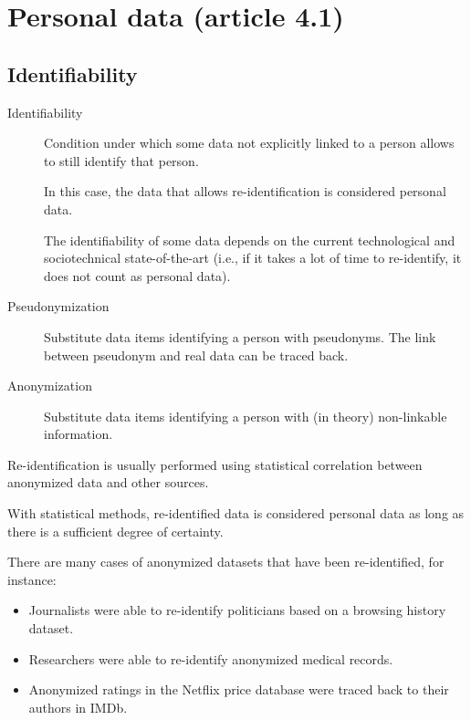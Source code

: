 \section{Personal data (article 4.1)}


\subsection{Identifiability}

\begin{description}
    \item[Identifiability] 
        Condition under which some data not explicitly linked to a person allows to still identify that person.

        In this case, the data that allows re-identification is considered personal data.

        \begin{remark}
            The identifiability of some data depends on the current technological and sociotechnical state-of-the-art (i.e., if it takes a lot of time to re-identify, it does not count as personal data).
        \end{remark}

    \item[Pseudonymization] 
        Substitute data items identifying a person with pseudonyms. The link between pseudonym and real data can be traced back.

    \item[Anonymization] 
        Substitute data items identifying a person with (in theory) non-linkable information.
\end{description}

\begin{remark}
    Re-identification is usually performed using statistical correlation between anonymized data and other sources.
    
    With statistical methods, re-identified data is considered personal data as long as there is a sufficient degree of certainty.
\end{remark}

\begin{example}
    There are many cases of anonymized datasets that have been re-identified, for instance:
    \begin{itemize}
        \item Journalists were able to re-identify politicians based on a browsing history dataset.
        \item Researchers were able to re-identify anonymized medical records.
        \item Anonymized ratings in the Netflix price database were traced back to their authors in IMDb.
    \end{itemize}
\end{example}


